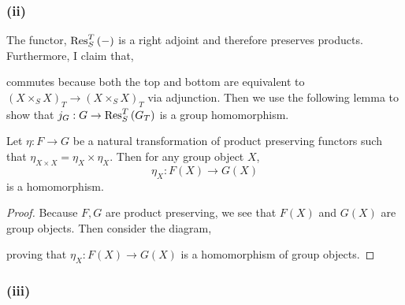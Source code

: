 \documentclass[12pt]{article}
\begin{document}
\subsubsection{(ii)}

The functor, $\mathrm{Res}^{T}_{S} \left( - \right)$ is a right adjoint and therefore preserves products. Furthermore, I claim that,
\begin{center}
\end{center}
commutes because both the top and bottom are equivalent to $(X \times_S X)_T \to (X \times_S X)_T$ via adjunction. Then we use the following lemma to show that $j_G : G \to \mathrm{Res}^{T}_{S} \left( G_T \right)$ is a group homomorphism. 

\begin{lemma}
Let $\eta : F \to G$ be a natural transformation of product preserving functors such that $\eta_{X \times X} = \eta_X \times \eta_X$. Then for any group object $X$,
\[ \eta_X : F(X) \to G(X) \]
is a homomorphism. 
\end{lemma}

\begin{proof}
Because $F, G$ are product preserving, we see that $F(X)$ and $G(X)$ are group objects. Then consider the diagram,
\begin{center}
\end{center}
proving that $\eta_X : F(X) \to G(X)$ is a homomorphism of group objects.
\end{proof}

\subsubsection{(iii)}
\end{document}
